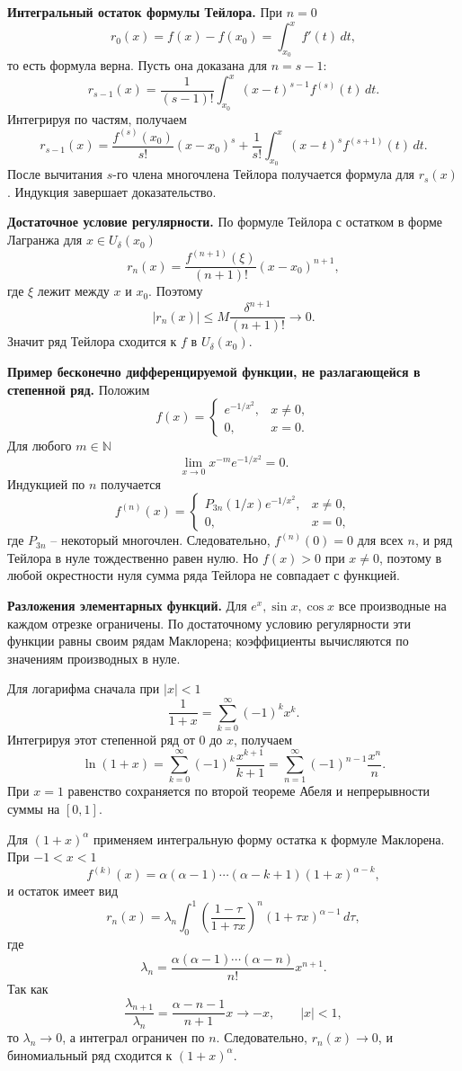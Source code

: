 \documentclass[12pt,a4paper]{article}
\newcommand{\N}{\mathbb{N}}
\newcommand{\dd}{\,d}
\begin{document}
\textbf{Интегральный остаток формулы Тейлора.}
При \(n=0\)
\[
  r_0(x)=f(x)-f(x_0)=\int_{x_0}^{x}f'(t)\dd t,
\]
то есть формула верна. Пусть она доказана для \(n=s-1\):
\[
  r_{s-1}(x)=\frac1{(s-1)!}\int_{x_0}^{x}(x-t)^{s-1}f^{(s)}(t)\dd t.
\]
Интегрируя по частям, получаем
\[
  r_{s-1}(x)
  =
  \frac{f^{(s)}(x_0)}{s!}(x-x_0)^s
  +
  \frac1{s!}\int_{x_0}^{x}(x-t)^sf^{(s+1)}(t)\dd t.
\]
После вычитания \(s\)-го члена многочлена Тейлора получается формула для
\(r_s(x)\). Индукция завершает доказательство.

\textbf{Достаточное условие регулярности.}
По формуле Тейлора с остатком в форме Лагранжа для
\(x\in U_\delta(x_0)\)
\[
  r_n(x)=\frac{f^{(n+1)}(\xi)}{(n+1)!}(x-x_0)^{n+1},
\]
где \(\xi\) лежит между \(x\) и \(x_0\). Поэтому
\[
  |r_n(x)|
  \le
  M\frac{\delta^{n+1}}{(n+1)!}\to0.
\]
Значит ряд Тейлора сходится к \(f\) в \(U_\delta(x_0)\).

\textbf{Пример бесконечно дифференцируемой функции, не разлагающейся в
степенной ряд.}
Положим
\[
  f(x)=
  \begin{cases}
    e^{-1/x^2},& x\ne0,\\
    0,& x=0.
  \end{cases}
\]
Для любого \(m\in\N\)
\[
  \lim_{x\to0}x^{-m}e^{-1/x^2}=0.
\]
Индукцией по \(n\) получается
\[
  f^{(n)}(x)=
  \begin{cases}
    P_{3n}(1/x)e^{-1/x^2},& x\ne0,\\
    0,& x=0,
  \end{cases}
\]
где \(P_{3n}\) -- некоторый многочлен. Следовательно,
\(f^{(n)}(0)=0\) для всех \(n\), и ряд Тейлора в нуле тождественно равен
нулю. Но \(f(x)>0\) при \(x\ne0\), поэтому в любой окрестности нуля сумма
ряда Тейлора не совпадает с функцией.

\textbf{Разложения элементарных функций.}
Для \(e^x,\sin x,\cos x\) все производные на каждом отрезке ограничены.
По достаточному условию регулярности эти функции равны своим рядам
Маклорена; коэффициенты вычисляются по значениям производных в нуле.

Для логарифма сначала при \(|x|<1\)
\[
  \frac1{1+x}=\sum_{k=0}^{\infty}(-1)^kx^k.
\]
Интегрируя этот степенной ряд от \(0\) до \(x\), получаем
\[
  \ln(1+x)=\sum_{k=0}^{\infty}(-1)^k\frac{x^{k+1}}{k+1}
  =
  \sum_{n=1}^{\infty}(-1)^{n-1}\frac{x^n}{n}.
\]
При \(x=1\) равенство сохраняется по второй теореме Абеля и непрерывности
суммы на \([0,1]\).

Для \((1+x)^\alpha\) применяем интегральную форму остатка к формуле
Маклорена. При \(-1<x<1\)
\[
  f^{(k)}(x)=\alpha(\alpha-1)\cdots(\alpha-k+1)(1+x)^{\alpha-k},
\]
и остаток имеет вид
\[
  r_n(x)=
  \lambda_n
  \int_0^1
  \left(\frac{1-\tau}{1+\tau x}\right)^n
  (1+\tau x)^{\alpha-1}\dd\tau,
\]
где
\[
  \lambda_n=
  \frac{\alpha(\alpha-1)\cdots(\alpha-n)}{n!}x^{n+1}.
\]
Так как
\[
  \frac{\lambda_{n+1}}{\lambda_n}
  =
  \frac{\alpha-n-1}{n+1}x\to -x,\qquad |x|<1,
\]
то \(\lambda_n\to0\), а интеграл ограничен по \(n\). Следовательно,
\(r_n(x)\to0\), и биномиальный ряд сходится к \((1+x)^\alpha\).
\end{document}
